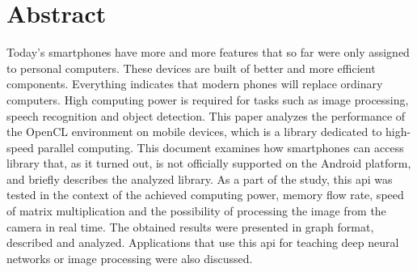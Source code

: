\section*{Abstract}
Today's smartphones have more and more features that so far were only assigned to personal computers. These devices are built of better and more efficient components. Everything indicates that modern phones will replace ordinary computers. High computing power is required for tasks such as image processing, speech recognition and object detection. This paper analyzes the performance of the OpenCL environment on mobile devices, which is a library dedicated to high-speed parallel computing. This document examines how smartphones can access library that, as it turned out, is not officially supported on the Android platform, and briefly describes the analyzed library. As a part of the study, this api was tested in the context of the achieved computing power, memory flow rate, speed of matrix multiplication and the possibility of processing the image from the camera in real time. The obtained results were presented in graph format, described and analyzed. Applications that use this api for teaching deep neural networks or image processing were also discussed.

